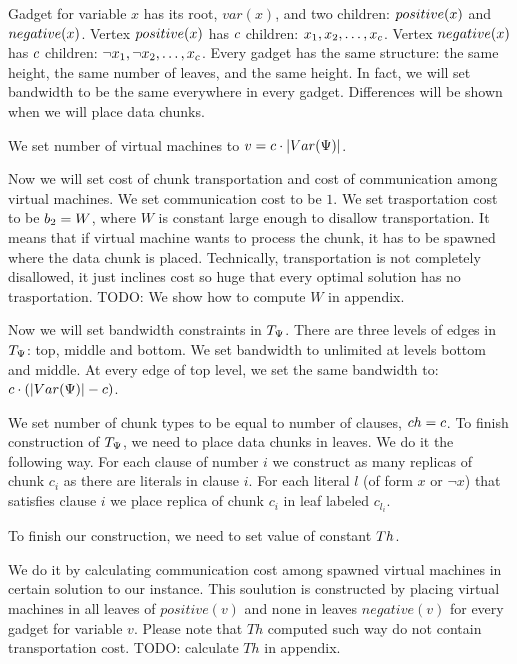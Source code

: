 Gadget for variable $x$ has its root, $var(x)$, and two children:
$positive(x)$ and $negative(x)$. Vertex $positive(x)$ has $c$
children: $x_1, x_2, \ldots, x_{c}$. Vertex $negative(x)$ has
$c$ children: $\neg x_1, \neg x_2, \dots, x_{c}$. Every
gadget has the same structure: the same height, the same number of
leaves, and the same height. In fact, we will set bandwidth to be the
same everywhere in every gadget. Differences will be shown when we
will place data chunks.

We set number of virtual machines to $v = c \cdot |Var(\Psi)|$.

Now we will set cost of chunk transportation and cost of communication
among virtual machines. We set communication cost to be $1$. We set
trasportation cost to be $b_2 = W$, where $W$ is constant large enough
to disallow transportation. It means that if virtual machine wants to
process the chunk, it has to be spawned where the data chunk is
placed. Technically, transportation is not completely disallowed, it
just inclines cost so huge that every optimal solution has no
trasportation. TODO: We show how to compute $W$ in appendix.

Now we will set bandwidth constraints in $T_{\Psi}$. There are three
levels of edges in $T_{\Psi}$: top, middle and bottom. We set
bandwidth to unlimited at levels bottom and middle. At every edge of
top level, we set the same bandwidth to: $c \cdot (|Var(\Psi)| -
c)$.

We set number of chunk types to be equal to number of clauses, $ch =
c$. To finish construction of $T_{\Psi}$, we need to place data chunks in
leaves. We do it the following way. For each clause of number $i$ we
construct as many replicas of chunk $c_i$ as there are literals in
clause $i$. For each literal $l$ (of form $x$ or $\neg x$) that satisfies clause $i$ we place
replica of chunk $c_i$ in leaf labeled $c_{l_i}$.

To finish our construction, we need to set value of constant $Th$. 

 We
do it by calculating communication cost among spawned virtual machines in
certain solution to our instance. This soulution is constructed by placing
virtual machines in all leaves of $positive(v)$ and none in leaves
$negative(v)$ for every gadget for variable $v$. Please note that $Th$
computed such way do not contain transportation cost. TODO: calculate
$Th$ in appendix.

